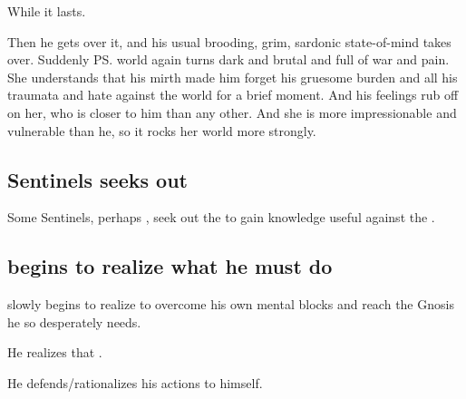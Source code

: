 While it lasts. 

Then he gets over it, and his usual brooding, grim, sardonic state-of-mind takes over. 
Suddenly \ps{\Criseis} world again turns dark and brutal and full of war and pain.
She understands that his mirth made him forget his gruesome burden and all his traumata and hate against the world for a brief moment. 
And his feelings rub off on her, who is closer to him than any other. 
And she is more impressionable and vulnerable than he, so it rocks her world more strongly. 





\subsection{Sentinels seeks out \voyagers}
Some Sentinels, perhaps \Ishnaruchaefir, seek out the  to gain knowledge useful against the \banes. 








\subsection{\Ishnaruchaefir{} begins to realize what he must do}
\Ishnaruchaefir{} slowly begins to realize  to overcome his own mental blocks and reach the Gnosis he so desperately needs. 


He realizes that . 


He defends/rationalizes his actions to himself. 


